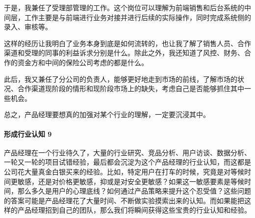 \documentclass[letterpaper,11pt,english]{sphinxmanual}
\begin{document}
于是，我兼任了受理部管理的工作。这个岗位可以理解为前端销售和后台系统的中间层，工作主要是与前端进行业务对接并进行后续的实际操作，同时完成系统侧的录入、审核等。

这样的经历让我明白了业务本身到底是如何流转的，也让我了解了销售人员、合作渠道和受理的同事的利益诉求分别是什么。除此之外，我还知道了风控、财务、合作的资金方和中间的保险公司考虑的都是什么。

此后，我又兼任了分公司的负责人，能够更好地走到市场的前线，了解市场的状况、合作渠道现阶段的情形和现阶段市场上的缺失，考虑自己是否能够抓住其中一些机会。

总之，产品经理要想真的加强对某个行业的理解，一定要沉浸其中。


\paragraph{形成行业认知 9\sphinxfootnotemark[440]}
\label{\detokenize{chapter_knowledge/industry_analysis:id23}}%
\begin{footnotetext}[440]\sphinxAtStartFootnote
{}
%
\end{footnotetext}\ignorespaces 
产品经理在一个行业待久了，大量的行业研究、竞品分析、用户访谈、数据分析、一轮又一轮的项目试错经验，最后都会沉淀为这个产品经理的行业认知，而这都是公司花大量真金白银买来的经验。比如，特定用户在打车的时候，究竟是对等候时间更敏感，还是对价格更敏感，抑或是对安全更敏感？如果这一敏感要素是等候时间，那么多久是用户的心理底线？如何通过产品策略来提升这个忍受值？这些问题的答案可能是产品经理花了大量时间、不断做实验摸索出来的认知。而如果能把这样的产品经理招到自己的团队，那么我们将瞬间获得这些宝贵的行业认知和经验。
\end{document}
